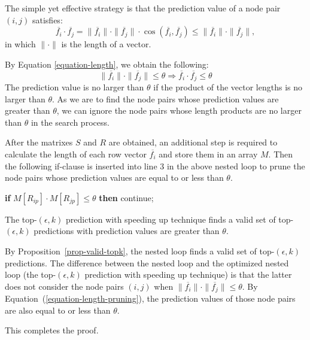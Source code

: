 The simple yet effective strategy is that the prediction value of a node pair $(i, j)$ satisfies:
\begin{equation}
\label{equation-length}
\overline{f_i} \cdot \overline{f_j} = \|\overline{f_i} \| \cdot \| \overline{f_j} \| \cdot
\cos(\overline{f_i}, \overline{f_j}) \leq \|\overline{f_i} \| \cdot \| \overline{f_j} \|,
\end{equation} in which $\|\cdot\|$ is the length of a vector.

By Equation \ref{equation-length}, we obtain the following:
\begin{equation}
\label{equation-length-pruning}
\|\overline{f_i} \| \cdot \| \overline{f_j} \| \leq \theta \Longrightarrow \overline{f_i} \cdot \overline{f_j} \leq \theta
\end{equation}
The prediction value is no larger than $\theta$ if the product of the vector lengths  is no larger than $\theta$.
As we are to find the node pairs whose prediction values are greater than $\theta$, we can ignore
the node pairs whose length products are no larger than $\theta$ in the search process.

After  the matrixes $S$ and $R$ are obtained, an additional step is required to calculate the length of each row
vector $\overline{f_i}$ and store them in an array $M$. Then the following if-clause is inserted  into line 3
in the above nested loop to prune the node pairs whose prediction values are equal to or less than $\theta$.
\begin{tabbing}\hspace{5ex}\=
{\bf if} $M[R_{ip}] \cdot M[R_{jp}] \leq \theta$ {\bf then} continue;
\end{tabbing}



\begin{prop}
The top-$(\epsilon, k)$ prediction with speeding up technique finds a valid set of top-$(\epsilon, k)$
predictions with prediction values are greater than $\theta$.
\end{prop}
\begin{IEEEproof}
By Proposition~\ref{prop-valid-topk}, the nested loop finds a valid set of
top-$(\epsilon, k)$ predictions. The difference between the nested loop
and the optimized nested loop (\ie the top-$(\epsilon, k)$ prediction with speeding up technique)
is that the latter does not consider the node pairs $(i, j)$
when $\|\overline{f_i} \| \cdot \| \overline{f_j} \| \leq \theta$.
By Equation~(\ref{equation-length-pruning}), the prediction values of those node pairs
are also  equal to or less than $\theta$.

This completes the proof.
\end{IEEEproof}


